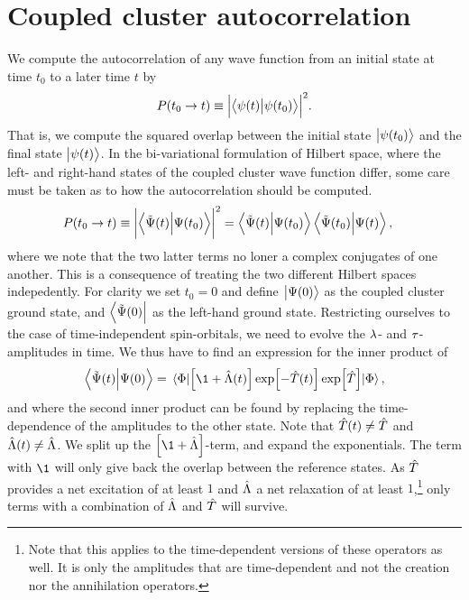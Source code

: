 \chapter{Coupled cluster autocorrelation}
    \label{app:cc-autocorrelation}
    We compute the autocorrelation of any wave function from an initial state at
    time $t_0$ to a later time $t$ by
    \begin{align}
        P(t_0 \to t)
        \equiv \abs{\braket{\psi(t)}{\psi(t_0)}}^2.
    \end{align}
    That is, we compute the squared overlap between the initial state
    $\ket{\psi(t_0)}$ and the final state $\ket{\psi(t)}$.
    In the bi-variational formulation of Hilbert space, where the left- and
    right-hand states of the coupled cluster wave function differ, some care
    must be taken as to how the autocorrelation should be computed.
    \begin{align}
        P(t_0 \to t)
        &\equiv \abs{\braket{\tilde{\Psi}(t)}{\Psi(t_0)}}^2
        = \braket{\tilde{\Psi}(t)}{\Psi(t_0)}
        \braket{\tilde{\Psi}(t_0)}{\Psi(t)},
    \end{align}
    where we note that the two latter terms no loner a complex conjugates of one
    another.
    This is a consequence of treating the two different Hilbert spaces
    indepedently.
    For clarity we set $t_0 = 0$ and define $\ket{\Psi(0)}$ as the coupled
    cluster ground state, and $\bra{\tilde{\Psi}(0)}$ as the left-hand ground
    state.
    Restricting ourselves to the case of time-independent spin-orbitals, we need
    to evolve the $\lambda$- and $\tau$-amplitudes in time.
    We thus have to find an expression for the inner product of
    \begin{gather}
        \braket{\tilde{\Psi}(t)}{\Psi(0)}
        =
        \mel{\slat}{
            \brak{\1 + \clustl(t)}
            \exp[-\clust(t)]
            \exp[\clust]
        }{\slat},
    \end{gather}
    and where the second inner product can be found by replacing the
    time-dependence of the amplitudes to the other state.
    Note that $\hat{T}(t) \neq \hat{T}$ and $\hat{\Lambda}(t) \neq \hat{\Lambda}$.
    We split up the $\brak{\1 + \clustl}$-term, and expand the exponentials.
    The term with $\1$ will only give back the overlap between the reference
    states.
    As $\hat{T}$ provides a net excitation of at least $1$ and $\hat{\Lambda}$ a net
    relaxation of at least $1$,\footnote{
        Note that this applies to the time-dependent versions
        of these operators as well. It is only the amplitudes that are
        time-dependent and not the creation nor the annihilation operators.
    } only terms with a combination of $\hat{\Lambda}$ and $\hat{T}$ will survive.

